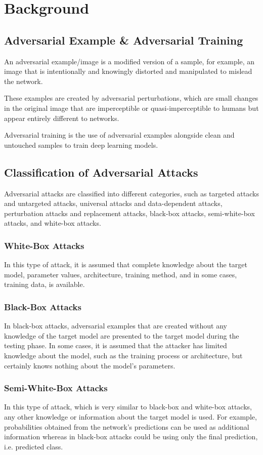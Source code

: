 \documentclass[lettersize,journal]{IEEEtran}
\begin{document}
\section{Background}
\subsection*{Adversarial Example  \& Adversarial Training}
An adversarial example/image is a modified version of a sample, for example, an image that is intentionally and knowingly distorted and manipulated to mislead the network.

These examples are created by adversarial perturbations, which are small changes in the original image that are imperceptible or quasi-imperceptible to humans but appear entirely different to networks.

Adversarial training is the use of adversarial examples alongside clean and untouched samples to train deep learning models.

\subsection*{Classification of Adversarial Attacks}
Adversarial attacks are classified into different categories, such as targeted attacks and untargeted attacks, universal attacks and data-dependent attacks, perturbation attacks and replacement attacks, black-box attacks, semi-white-box attacks, and white-box attacks.

\subsubsection*{White-Box Attacks}
In this type of attack, it is assumed that complete knowledge about the target model, parameter values, architecture, training method, and in some cases, training data, is available.

\subsubsection*{Black-Box Attacks}
In black-box attacks, adversarial examples that are created without any knowledge of the target model are presented to the target model during the testing phase. In some cases, it is assumed that the attacker has limited knowledge about the model, such as the training process or architecture, but certainly knows nothing about the model's parameters.

\subsubsection*{Semi-White-Box Attacks}
In this type of attack, which is very similar to black-box and white-box attacks, any other knowledge or information about the target model is used. For example, probabilities obtained from the network's predictions can be used as additional information whereas in black-box attacks could be using only the final prediction, i.e. predicted class.
\end{document}
